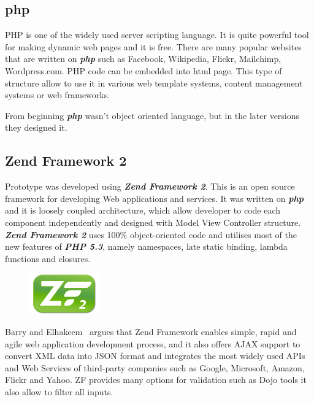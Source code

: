 \subsection{php}
PHP is one of the widely used server scripting language. It is quite powerful tool for making dynamic web pages and it is free. There are many popular websites that are written on \textbf{\textit{php}} such as Facebook, Wikipedia, Flickr, Mailchimp, Wordpress.com. PHP code can be embedded into html page. This type of structure allow to use it in various web template systems, content management systems or web frameworks.

From beginning \textbf{\textit{php}} wasn't object oriented language, but in the later versions they designed it.

\subsection{Zend Framework 2}
Prototype was developed using \textbf{\textit{Zend Framework 2}}. This is an open source framework for developing Web applications and services. It was written on \textbf{\textit{php}} and it is loosely coupled architecture, which allow developer to code each component independently and designed with Model View Controller structure. \textbf{\textit{Zend Framework 2}} uses 100\% object-oriented code and utilises most of the new features of \textbf{\textit{PHP 5.3}}, namely namespaces, late static binding, lambda functions and closures.~\cite{ZendFramework-Website-About}

\begin{figure}
	\includegraphics[width=3cm]{img/zf2/zf2-logo.png}
\end{figure} 
Barry and Elhakeem~\cite{ZendFramework-Security-Model} argues that Zend Framework enables simple, rapid and agile web application development process, and it also offers AJAX support to convert XML data into JSON format and integrates the most widely used APIs and Web Services of third-party companies such as Google, Microsoft, Amazon, Flickr and Yahoo. ZF provides many options for validation such as Dojo tools it also allow to filter all inputs.


